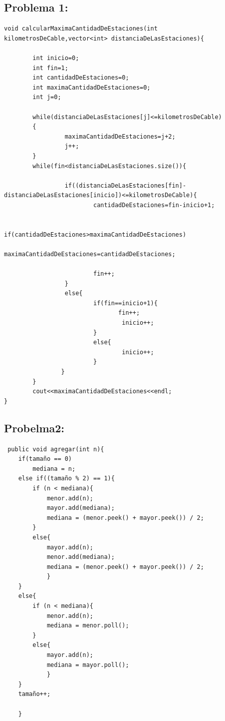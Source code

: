 \documentclass[10pt, a4paper]{article}
\begin{document}
\subsection{Problema 1:}
\begin{verbatim}
void calcularMaximaCantidadDeEstaciones(int kilometrosDeCable,vector<int> distanciaDeLasEstaciones){
	    
	    int inicio=0;
	    int fin=1;
	    int cantidadDeEstaciones=0;
	    int maximaCantidadDeEstaciones=0;
	    int j=0;
	    
	    while(distanciaDeLasEstaciones[j]<=kilometrosDeCable)
	    {
		         maximaCantidadDeEstaciones=j+2;
		         j++;
	    }
	    while(fin<distanciaDeLasEstaciones.size()){
	     
		         if((distanciaDeLasEstaciones[fin]-distanciaDeLasEstaciones[inicio])<=kilometrosDeCable){
			             cantidadDeEstaciones=fin-inicio+1;
			             
			             if(cantidadDeEstaciones>maximaCantidadDeEstaciones)
				                 maximaCantidadDeEstaciones=cantidadDeEstaciones;
			
			             fin++;
		         }
		         else{
			             if(fin==inicio+1){
			                	fin++;
				                 inicio++;
			             }
			             else{
				                 inicio++;
			             }
		        }
	    }
	    cout<<maximaCantidadDeEstaciones<<endl;
}
\end{verbatim}

\subsection{Probelma2:}
\begin{verbatim}
 public void agregar(int n){
	if(tamaño == 0)
		mediana = n;
	else if((tamaño % 2) == 1){ 
		if (n < mediana){ 
			menor.add(n);
			mayor.add(mediana); 
			mediana = (menor.peek() + mayor.peek()) / 2; 
		}
		else{
			mayor.add(n);
			menor.add(mediana);
			mediana = (menor.peek() + mayor.peek()) / 2;
			}
	}
	else{
		if (n < mediana){
			menor.add(n);
			mediana = menor.poll();
		}
		else{
			mayor.add(n);
			mediana = mayor.poll();
			}
	}
	tamaño++;
		
	}


\end{verbatim}
\end{document}
